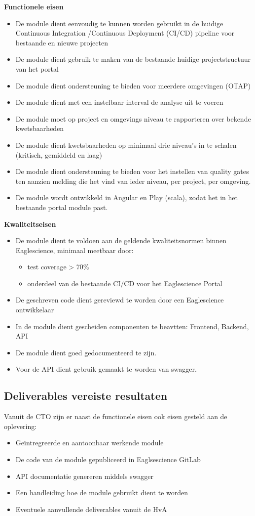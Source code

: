 \textbf{Functionele eisen}
\begin{itemize}
\item De module dient eenvoudig te kunnen worden gebruikt in de huidige Continuous Integration /Continuous Deployment (CI/CD) pipeline voor bestaande en nieuwe projecten
\item De module dient gebruik te maken van de bestaande huidige projectstructuur van het portal
\item De module dient ondersteuning te bieden voor meerdere omgevingen (OTAP)
\item De module dient met een instelbaar interval de analyse uit te voeren
\item De module moet op project en omgevings niveau te rapporteren over bekende kwetsbaarheden
\item De module dient kwetsbaarheden op minimaal drie niveau’s in te schalen (kritisch, gemiddeld en laag)
\item De module dient ondersteuning te bieden voor het instellen van quality gates ten aanzien melding die het vind van ieder niveau, per project, per omgeving.
\item De module wordt ontwikkeld in Angular en Play (scala), zodat het in het bestaande portal module past.
\end{itemize}
\textbf{Kwaliteitseisen}
\begin{itemize}
\item De module dient te voldoen aan de geldende kwaliteitsnormen binnen Eaglescience, minimaal meetbaar door:
	\begin{itemize}
	\item test coverage > 70\%
	\item onderdeel van de bestaande CI/CD voor het Eaglescience Portal
	\end{itemize}
\item De geschreven code dient gereviewd te worden door een Eaglescience ontwikkelaar
\item In de module dient gescheiden componenten te beavtten: Frontend, Backend, API
\item De module dient goed gedocumenteerd te zijn.
\item Voor de API dient gebruik gemaakt te worden van swagger.
\end{itemize}

\subsection{Deliverables vereiste resultaten}\label{subsec:deliverables-vereiste-resultaten}
Vanuit de CTO zijn er naast de functionele eisen ook eisen gesteld aan de oplevering:
\begin{itemize}
\item Geïntregreerde en aantoonbaar werkende module
\item De code van de module gepubliceerd in Eaglsescience GitLab
\item API documentatie genereren middels swagger
\item Een handleiding hoe de module gebruikt dient te worden
\item Eventuele aanvullende deliverables vanuit de HvA
\end{itemize}

